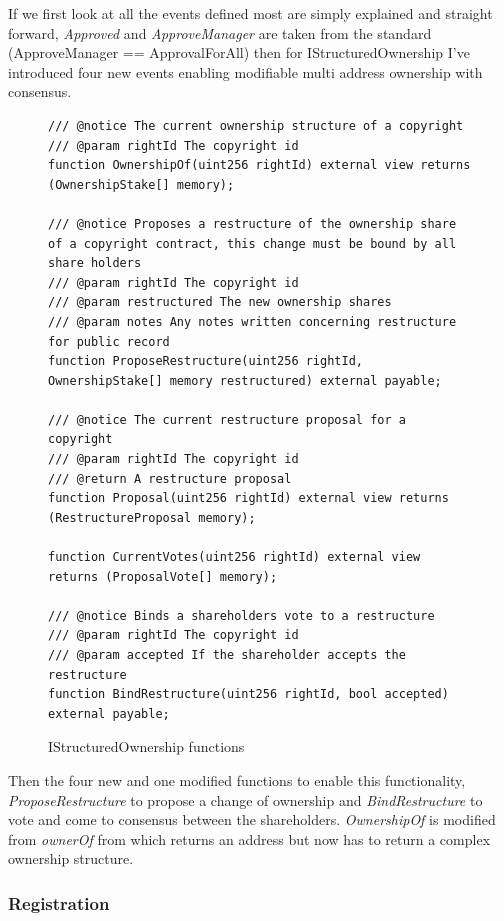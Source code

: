 If we first look at all the events defined most are simply explained and straight forward, \textit{Approved} and \textit{ApproveManager} are taken from the \nft standard (ApproveManager == ApprovalForAll) then for IStructuredOwnership I've introduced four new events enabling modifiable multi address ownership with consensus.


\begin{figure}[H]
\caption{IStructuredOwnership functions}
\centering
\begin{lstlisting}[language=Solidity]
/// @notice The current ownership structure of a copyright
/// @param rightId The copyright id
function OwnershipOf(uint256 rightId) external view returns (OwnershipStake[] memory);

/// @notice Proposes a restructure of the ownership share of a copyright contract, this change must be bound by all share holders
/// @param rightId The copyright id
/// @param restructured The new ownership shares
/// @param notes Any notes written concerning restructure for public record
function ProposeRestructure(uint256 rightId, OwnershipStake[] memory restructured) external payable;

/// @notice The current restructure proposal for a copyright
/// @param rightId The copyright id
/// @return A restructure proposal
function Proposal(uint256 rightId) external view returns (RestructureProposal memory);
    
function CurrentVotes(uint256 rightId) external view returns (ProposalVote[] memory);

/// @notice Binds a shareholders vote to a restructure
/// @param rightId The copyright id
/// @param accepted If the shareholder accepts the restructure
function BindRestructure(uint256 rightId, bool accepted) external payable;
\end{lstlisting}
\end{figure}

Then the four new and one modified functions to enable this functionality, \textit{ProposeRestructure} to propose a change of ownership and \textit{BindRestructure} to vote and come to consensus between the shareholders. \textit{OwnershipOf} is modified from \textit{ownerOf} from \nft which returns an address but now has to return a complex ownership structure.

\subsubsection{Registration}

